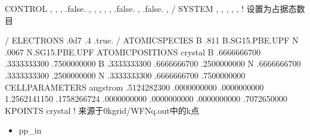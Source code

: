 \documentclass[a4paper,12pt,english]{sphinxmanual}
\begin{document}
\begin{sphinxVerbatim}[commandchars=\\\{\}]
 CONTROL
                          ,
                    ,
                   ,
                    .false. ,
                         ,
                         ,
                     ,
                         ,
                       .false. ,
                       .false. ,
 /
 SYSTEM
                         ,
                           ,
                          ,
                        ,
                         ,     ! 设置为占据态数目

 /
 ELECTRONS
              
              .0d\PYGZhy{}7
              
              .4
           
            
            .true.
/
ATOMIC\PYGZus{}SPECIES
B      .811 B.SG15.PBE.UPF
N      .0067 N.SG15.PBE.UPF
ATOMIC\PYGZus{}POSITIONS crystal
B            .6666666700       .3333333300       .7500000000
B            .3333333300       .6666666700       .2500000000
N            .6666666700       .3333333300       .2500000000
N            .3333333300       .6666666700       .7500000000
CELL\PYGZus{}PARAMETERS angstrom
      .5124282300       .0000000000       .0000000000
     \PYGZhy{}1.2562141150       .1758266724       .0000000000
      .0000000000       .0000000000       .7072650000
K\PYGZus{}POINTS crystal  ! 来源于0\PYGZhy{}kgrid/WFNq.out中的k点
\end{sphinxVerbatim}
\begin{itemize}
\item {} 
\sphinxAtStartPar
pp\_in

\end{itemize}
\end{document}
